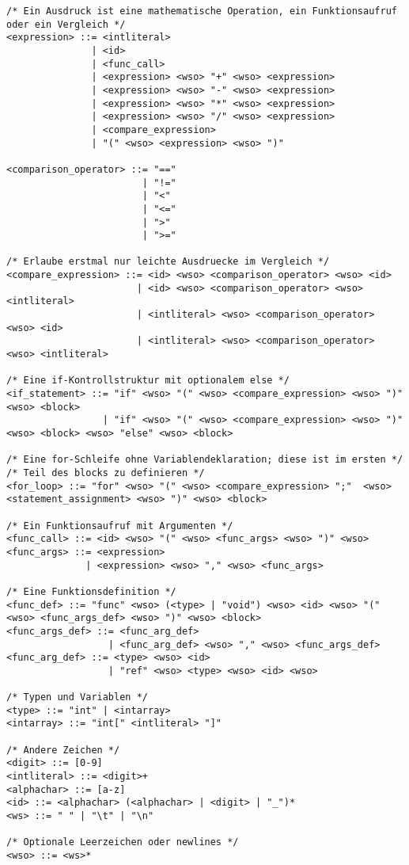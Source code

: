 \begin{lstlisting}
/* Ein Ausdruck ist eine mathematische Operation, ein Funktionsaufruf oder ein Vergleich */
<expression> ::= <intliteral>
               | <id>
               | <func_call>
               | <expression> <wso> "+" <wso> <expression>
               | <expression> <wso> "-" <wso> <expression>
               | <expression> <wso> "*" <wso> <expression>
               | <expression> <wso> "/" <wso> <expression>
               | <compare_expression>
               | "(" <wso> <expression> <wso> ")"

<comparison_operator> ::= "=="
                        | "!="
                        | "<"
                        | "<="
                        | ">"
                        | ">="

/* Erlaube erstmal nur leichte Ausdruecke im Vergleich */
<compare_expression> ::= <id> <wso> <comparison_operator> <wso> <id>
                       | <id> <wso> <comparison_operator> <wso> <intliteral>
                       | <intliteral> <wso> <comparison_operator> <wso> <id>
                       | <intliteral> <wso> <comparison_operator> <wso> <intliteral>

/* Eine if-Kontrollstruktur mit optionalem else */
<if_statement> ::= "if" <wso> "(" <wso> <compare_expression> <wso> ")" <wso> <block>
                 | "if" <wso> "(" <wso> <compare_expression> <wso> ")"  <wso> <block> <wso> "else" <wso> <block>

/* Eine for-Schleife ohne Variablendeklaration; diese ist im ersten */
/* Teil des blocks zu definieren */
<for_loop> ::= "for" <wso> "(" <wso> <compare_expression> ";"  <wso> <statement_assignment> <wso> ")" <wso> <block>

/* Ein Funktionsaufruf mit Argumenten */
<func_call> ::= <id> <wso> "(" <wso> <func_args> <wso> ")" <wso>
<func_args> ::= <expression>
              | <expression> <wso> "," <wso> <func_args>

/* Eine Funktionsdefinition */
<func_def> ::= "func" <wso> (<type> | "void") <wso> <id> <wso> "(" <wso> <func_args_def> <wso> ")" <wso> <block>
<func_args_def> ::= <func_arg_def>
                  | <func_arg_def> <wso> "," <wso> <func_args_def>
<func_arg_def> ::= <type> <wso> <id>
                  | "ref" <wso> <type> <wso> <id> <wso>

/* Typen und Variablen */
<type> ::= "int" | <intarray>
<intarray> ::= "int[" <intliteral> "]"

/* Andere Zeichen */
<digit> ::= [0-9]
<intliteral> ::= <digit>+
<alphachar> ::= [a-z]
<id> ::= <alphachar> (<alphachar> | <digit> | "_")*
<ws> ::= " " | "\t" | "\n"

/* Optionale Leerzeichen oder newlines */
<wso> ::= <ws>*

  \end{lstlisting}


